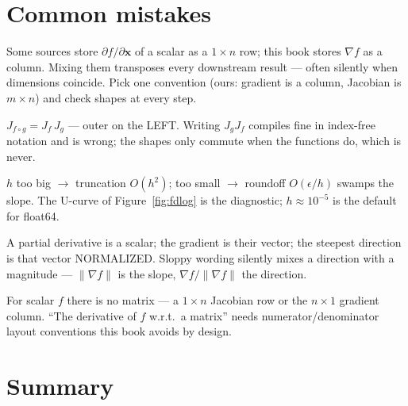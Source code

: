 \section{Common mistakes}\label{sec:mvc-mistakes}

\begin{tripwire}
Some sources store $\partial f/\partial\mathbf x$ of a scalar as a
$1\times n$ row; this book stores $\nabla f$ as a column. Mixing them
transposes every downstream result --- often silently when dimensions
coincide. Pick one convention (ours: gradient is a column, Jacobian is
$m\times n$) and check shapes at every step.
\end{tripwire}

\begin{tripwire}
$J_{f\circ g}=J_f\,J_g$ --- outer on the LEFT. Writing $J_gJ_f$ compiles
fine in index-free notation and is wrong; the shapes only commute when
the functions do, which is never.
\end{tripwire}

\begin{tripwire}
$h$ too big $\to$ truncation $O(h^{2})$; too small $\to$ roundoff
$O(\epsilon/h)$ swamps the slope. The U-curve of
Figure~\ref{fig:fdlog} is the diagnostic; $h\approx10^{-5}$ is the
default for float64.
\end{tripwire}

\begin{tripwire}
A partial derivative is a scalar; the gradient is their vector; the
steepest direction is that vector NORMALIZED. Sloppy wording silently
mixes a direction with a magnitude --- $\lVert\nabla f\rVert$ is the
slope, $\nabla f/\lVert\nabla f\rVert$ the direction.
\end{tripwire}

\begin{tripwire}
For scalar $f$ there is no matrix --- a $1\times n$ Jacobian row or the
$n\times1$ gradient column. ``The derivative of $f$ w.r.t.\ a matrix''
needs numerator/denominator layout conventions this book avoids by
design.
\end{tripwire}

\section{Summary}

